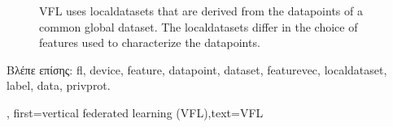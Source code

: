 {{\begin{figure}[H]
\begin{center}
			\end{center}
			\caption{VFL uses \gls{localdataset}s that are derived from the \gls{datapoint}s of a common global \gls{dataset}. 
				The \gls{localdataset}s differ in the choice of \gls{feature}s used to characterize the \gls{datapoint}s.\label{fig_vertical_FL}}
		\end{figure}
     \foreignlanguage{greek}{Βλέπε επίσης:} \gls{fl}, \gls{device}, \gls{feature}, \gls{datapoint}, \gls{dataset}, \gls{featurevec}, \gls{localdataset}, \gls{label}, \gls{data}, \gls{privprot}.},
	first={vertical federated learning (VFL)},text={VFL}
} 

